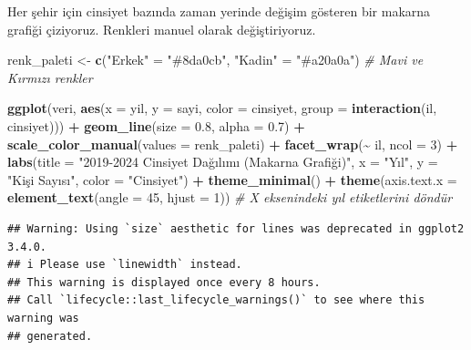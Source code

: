 \documentclass[
]{article}
\newenvironment{Shaded}{\begin{snugshade}}{\end{snugshade}}
\newcommand{\AttributeTok}[1]{\textcolor[rgb]{0.13,0.29,0.53}{#1}}
\newcommand{\CommentTok}[1]{\textcolor[rgb]{0.56,0.35,0.01}{\textit{#1}}}
\newcommand{\DecValTok}[1]{\textcolor[rgb]{0.00,0.00,0.81}{#1}}
\newcommand{\FloatTok}[1]{\textcolor[rgb]{0.00,0.00,0.81}{#1}}
\newcommand{\FunctionTok}[1]{\textcolor[rgb]{0.13,0.29,0.53}{\textbf{#1}}}
\newcommand{\NormalTok}[1]{#1}
\newcommand{\OtherTok}[1]{\textcolor[rgb]{0.56,0.35,0.01}{#1}}
\newcommand{\SpecialCharTok}[1]{\textcolor[rgb]{0.81,0.36,0.00}{\textbf{#1}}}
\newcommand{\StringTok}[1]{\textcolor[rgb]{0.31,0.60,0.02}{#1}}
\begin{document}
Her şehir için cinsiyet bazında zaman yerinde değişim gösteren bir
makarna grafiği çiziyoruz. Renkleri manuel olarak değiştiriyoruz.

\begin{Shaded}
\begin{Highlighting}[]
\NormalTok{renk\_paleti }\OtherTok{\textless{}{-}} \FunctionTok{c}\NormalTok{(}\StringTok{"Erkek"} \OtherTok{=} \StringTok{"\#8da0cb"}\NormalTok{, }\StringTok{"Kadin"} \OtherTok{=} \StringTok{"\#a20a0a"}\NormalTok{) }\CommentTok{\# Mavi ve Kırmızı renkler}


\FunctionTok{ggplot}\NormalTok{(veri, }\FunctionTok{aes}\NormalTok{(}\AttributeTok{x =}\NormalTok{ yil, }\AttributeTok{y =}\NormalTok{ sayi, }\AttributeTok{color =}\NormalTok{ cinsiyet, }\AttributeTok{group =} \FunctionTok{interaction}\NormalTok{(il, cinsiyet))) }\SpecialCharTok{+}
  \FunctionTok{geom\_line}\NormalTok{(}\AttributeTok{size =} \FloatTok{0.8}\NormalTok{, }\AttributeTok{alpha =} \FloatTok{0.7}\NormalTok{) }\SpecialCharTok{+} 
  \FunctionTok{scale\_color\_manual}\NormalTok{(}\AttributeTok{values =}\NormalTok{ renk\_paleti) }\SpecialCharTok{+} 
  \FunctionTok{facet\_wrap}\NormalTok{(}\SpecialCharTok{\textasciitilde{}}\NormalTok{ il, }\AttributeTok{ncol =} \DecValTok{3}\NormalTok{) }\SpecialCharTok{+} 
  \FunctionTok{labs}\NormalTok{(}\AttributeTok{title =} \StringTok{"2019{-}2024 Cinsiyet Dağılımı (Makarna Grafiği)"}\NormalTok{,}
       \AttributeTok{x =} \StringTok{"Yıl"}\NormalTok{,}
       \AttributeTok{y =} \StringTok{"Kişi Sayısı"}\NormalTok{,}
       \AttributeTok{color =} \StringTok{"Cinsiyet"}\NormalTok{) }\SpecialCharTok{+}
  \FunctionTok{theme\_minimal}\NormalTok{() }\SpecialCharTok{+}
  \FunctionTok{theme}\NormalTok{(}\AttributeTok{axis.text.x =} \FunctionTok{element\_text}\NormalTok{(}\AttributeTok{angle =} \DecValTok{45}\NormalTok{, }\AttributeTok{hjust =} \DecValTok{1}\NormalTok{)) }\CommentTok{\# X eksenindeki yıl etiketlerini döndür}
\end{Highlighting}
\end{Shaded}

\begin{verbatim}
## Warning: Using `size` aesthetic for lines was deprecated in ggplot2 3.4.0.
## i Please use `linewidth` instead.
## This warning is displayed once every 8 hours.
## Call `lifecycle::last_lifecycle_warnings()` to see where this warning was
## generated.
\end{verbatim}
\end{document}
